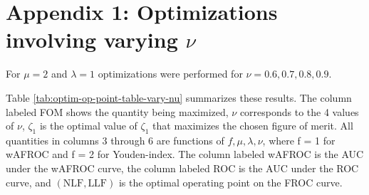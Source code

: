 \documentclass[
]{book}
\begin{document}
\hypertarget{optim-op-point-vary-nu}{%
\section{\texorpdfstring{Appendix 1: Optimizations involving varying \(\nu\)}{Appendix 1: Optimizations involving varying \textbackslash nu}}\label{optim-op-point-vary-nu}}

For \(\mu = 2\) and \(\lambda = 1\) optimizations were performed for \(\nu = 0.6, 0.7, 0.8, 0.9\).

Table \ref{tab:optim-op-point-table-vary-nu} summarizes these results. The column labeled FOM shows the quantity being maximized, \(\nu\) corresponds to the 4 values of \(\nu\), \(\zeta_1\) is the optimal value of \(\zeta_1\) that maximizes the chosen figure of merit. All quantities in columns 3 through 6 are functions of \(f, \mu, \lambda, \nu\), where f = 1 for wAFROC and f = 2 for Youden-index. The column labeled wAFROC is the AUC under the wAFROC curve, the column labeled ROC is the AUC under the ROC curve, and \(\left( \text{NLF}, \text{LLF}\right)\) is the optimal operating point on the FROC curve.

\begin{table}[H]

\caption{\label{tab:optim-op-point-table-vary-nu}Summary of optimization results for $\mu = 2$, $\lambda = 1$ and 4 values of $\nu$.}
\centering
{}
\end{table}
\end{document}
